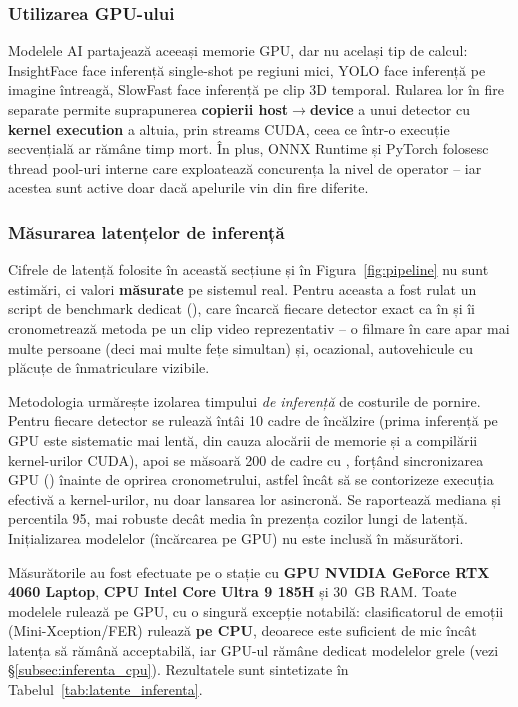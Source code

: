 \documentclass[../../main.tex]{subfiles}
\begin{document}
\subsubsection{Utilizarea GPU-ului}

Modelele AI partajează aceeași memorie GPU, dar nu același tip de calcul: InsightFace face inferență single-shot pe regiuni mici, YOLO face inferență pe imagine întreagă, SlowFast face inferență pe clip 3D temporal. Rularea lor în fire separate permite suprapunerea \textbf{copierii host$\to$device} a unui detector cu \textbf{kernel execution} a altuia, prin streams CUDA, ceea ce într-o execuție secvențială ar rămâne timp mort. În plus, ONNX Runtime și PyTorch folosesc thread pool-uri interne care exploatează concurența la nivel de operator -- iar acestea sunt active doar dacă apelurile vin din fire diferite.

\subsubsection{Măsurarea latențelor de inferență}
\label{subsec:masurare_latente}

Cifrele de latență folosite în această secțiune și în Figura~\ref{fig:pipeline} nu sunt estimări, ci valori \textbf{măsurate} pe sistemul real. Pentru aceasta a fost rulat un script de \linebreak benchmark dedicat (), care încarcă fiecare detector exact ca în  și îi cronometrează metoda  pe un clip video reprezentativ -- o filmare în care apar mai multe persoane (deci mai multe fețe simultan) și, ocazional, autovehicule cu plăcuțe de înmatriculare vizibile.

Metodologia urmărește izolarea timpului \emph{de inferență} de costurile de pornire. Pentru fiecare detector se rulează întâi 10 cadre de încălzire (prima inferență pe GPU este sistematic mai lentă, din cauza alocării de memorie și a compilării kernel-urilor CUDA), apoi se măsoară 200 de cadre cu , forțând sincronizarea GPU () înainte de oprirea cronometrului, astfel încât să se contorizeze execuția efectivă a kernel-urilor, nu doar lansarea lor asincronă. Se raportează mediana și percentila 95, mai robuste decât media în prezența cozilor lungi de latență. Inițializarea modelelor (încărcarea pe GPU) nu este inclusă în măsurători.

Măsurătorile au fost efectuate pe o stație cu \textbf{GPU NVIDIA GeForce RTX 4060 Laptop}, \textbf{CPU Intel Core Ultra 9 185H} și 30~GB RAM. Toate modelele rulează pe GPU, cu o singură excepție notabilă: clasificatorul de emoții (Mini-Xception/FER) rulează \textbf{pe CPU}, deoarece este suficient de mic încât latența să rămână acceptabilă, iar GPU-ul rămâne dedicat modelelor grele (vezi \S\ref{subsec:inferenta_cpu}). Rezultatele sunt sintetizate în Tabelul~\ref{tab:latente_inferenta}.
\end{document}
